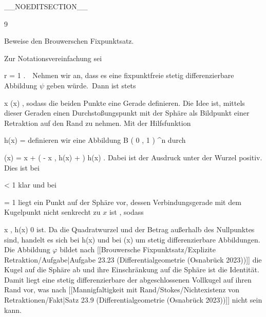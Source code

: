 __NOEDITSECTION__

{9}

{

Beweise den Brouwerschen Fixpunktsatz.

}
{

Zur Notationsvereinfachung sei

\mavergleichskette
{\vergleichskette
{ r
}
{ = }{ 1
}
{  }{
}
{    }{
}
{   }{
}
}
{}{}{.}  Nehmen wir an, dass es eine fixpunktfreie stetig differenzierbare Abbildung $\psi$ geben würde. Dann ist stets

\mavergleichskettedisp
{\vergleichskette
{ x
}
{ \neq} { \psi(x)
}
{ } {
}
{ } {
}
{ } {
}
}
{}{}{,}
sodass die beiden Punkte eine Gerade definieren. Die Idee ist, mittels dieser Geraden einen
 {} {}
Durchstoßungspunkt mit der Sphäre als Bildpunkt einer Retraktion auf den Rand zu nehmen. Mit der Hilfsfunktion

\mavergleichskettedisp
{\vergleichskette
{ h(x)
}
{ =} { {  }
}
{ } {
}
{ } {
}
{ } {
}
}
{}{}{}
definieren wir eine Abbildung
\maabbdisp {\varphi} { B  \left(  0 , 1 \right) } { \R^n
} {}
durch

\mavergleichskettedisphandlinks
{\vergleichskettedisphandlinks
{ \varphi(x)
}
{ =} { x + \left(  - \left\langle  x  , h(x)  \right\rangle +   \right) \cdot h(x)
}
{ } {
}
{ } {
}
{ } {
}
}
{}{}{.}
Dabei ist der Ausdruck unter der Wurzel positiv. Dies ist bei

\mavergleichskette
{\vergleichskette
{  \Vert
}
{ < }{ 1
}
{  }{
}
{    }{
}
{   }{
}
}
{}{}{}
klar und bei

\mavergleichskette
{\vergleichskette
{  \Vert
}
{ = }{ 1
}
{  }{
}
{    }{
}
{   }{
}
}
{}{}{}
liegt ein Punkt auf der Sphäre vor, dessen Verbindungsgerade mit dem Kugelpunkt
 nicht senkrecht zu $x$ ist
 {} {,}
sodass

\mavergleichskettedisp
{\vergleichskette
{ \left\langle  x  , h(x)  \right\rangle
}
{ \neq} { 0
}
{ } {
}
{ } {
}
{ } {
}
}
{}{}{}
ist. Da die Quadratwurzel und der Betrag außerhalb des Nullpunktes
sind, handelt es sich bei
\mathkor {} {h(x)} {und bei} {\varphi(x)} {}
um stetig differenzierbare Abbildungen. Die Abbildung $\varphi$ bildet nach
[[Brouwersche Fixpunktsatz/Explizite Retraktion/Aufgabe|Aufgabe 23.23 (Differentialgeometrie (Osnabrück 2023))]]
die Kugel auf die Sphäre ab und ihre Einschränkung auf die Sphäre ist die Identität. Damit liegt eine stetig differenzierbare
der abgeschlossenen Vollkugel auf ihren Rand vor, was nach
[[Mannigfaltigkeit mit Rand/Stokes/Nichtexistenz von Retraktionen/Fakt|Satz 23.9 (Differentialgeometrie (Osnabrück 2023))]]
nicht sein kann.

 }

